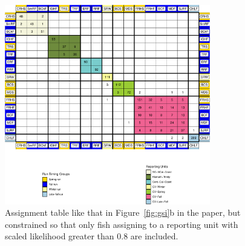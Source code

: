 \begin{figure}
\begin{center}
\includegraphics[width=0.8\textwidth]{images/ass-table-80-crop.pdf}
\end{center}
\caption[Assignment table for fish with scaled likelihood $ > 0.8$]{\footnotesize Assignment table
like that in Figure~\ref{fig:gsi}b in the paper, but constrained so that only fish assigning
to a reporting unit with scaled likelihood greater than 0.8 are included.}
\label{fig:eighty}
\end{figure}





